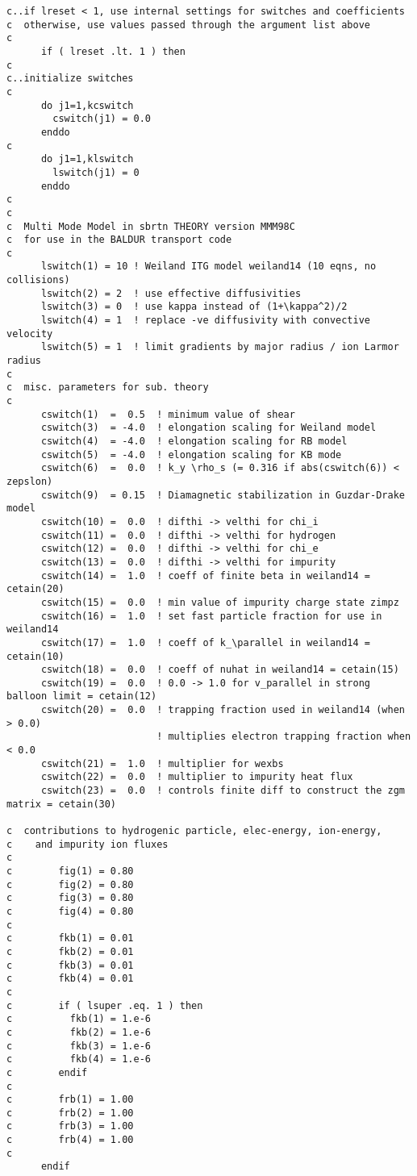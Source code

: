 \begin{verbatim}
c..if lreset < 1, use internal settings for switches and coefficients
c  otherwise, use values passed through the argument list above
c
      if ( lreset .lt. 1 ) then
c
c..initialize switches
c
      do j1=1,kcswitch
        cswitch(j1) = 0.0
      enddo
c
      do j1=1,klswitch
        lswitch(j1) = 0
      enddo
c
c
c  Multi Mode Model in sbrtn THEORY version MMM98C
c  for use in the BALDUR transport code
c
      lswitch(1) = 10 ! Weiland ITG model weiland14 (10 eqns, no collisions)
      lswitch(2) = 2  ! use effective diffusivities
      lswitch(3) = 0  ! use kappa instead of (1+\kappa^2)/2
      lswitch(4) = 1  ! replace -ve diffusivity with convective velocity
      lswitch(5) = 1  ! limit gradients by major radius / ion Larmor radius
c
c  misc. parameters for sub. theory
c
      cswitch(1)  =  0.5  ! minimum value of shear
      cswitch(3)  = -4.0  ! elongation scaling for Weiland model
      cswitch(4)  = -4.0  ! elongation scaling for RB model
      cswitch(5)  = -4.0  ! elongation scaling for KB mode
      cswitch(6)  =  0.0  ! k_y \rho_s (= 0.316 if abs(cswitch(6)) < zepslon)
      cswitch(9)  = 0.15  ! Diamagnetic stabilization in Guzdar-Drake model
      cswitch(10) =  0.0  ! difthi -> velthi for chi_i
      cswitch(11) =  0.0  ! difthi -> velthi for hydrogen
      cswitch(12) =  0.0  ! difthi -> velthi for chi_e
      cswitch(13) =  0.0  ! difthi -> velthi for impurity
      cswitch(14) =  1.0  ! coeff of finite beta in weiland14 = cetain(20)
      cswitch(15) =  0.0  ! min value of impurity charge state zimpz
      cswitch(16) =  1.0  ! set fast particle fraction for use in weiland14
      cswitch(17) =  1.0  ! coeff of k_\parallel in weiland14 = cetain(10)
      cswitch(18) =  0.0  ! coeff of nuhat in weiland14 = cetain(15)
      cswitch(19) =  0.0  ! 0.0 -> 1.0 for v_parallel in strong balloon limit = cetain(12)
      cswitch(20) =  0.0  ! trapping fraction used in weiland14 (when > 0.0)
                          ! multiplies electron trapping fraction when < 0.0
      cswitch(21) =  1.0  ! multiplier for wexbs 
      cswitch(22) =  0.0  ! multiplier to impurity heat flux
      cswitch(23) =  0.0  ! controls finite diff to construct the zgm matrix = cetain(30)

c  contributions to hydrogenic particle, elec-energy, ion-energy,
c    and impurity ion fluxes
c
c        fig(1) = 0.80
c        fig(2) = 0.80
c        fig(3) = 0.80
c        fig(4) = 0.80
c
c        fkb(1) = 0.01
c        fkb(2) = 0.01
c        fkb(3) = 0.01
c        fkb(4) = 0.01
c
c        if ( lsuper .eq. 1 ) then
c          fkb(1) = 1.e-6
c          fkb(2) = 1.e-6
c          fkb(3) = 1.e-6
c          fkb(4) = 1.e-6
c        endif
c
c        frb(1) = 1.00
c        frb(2) = 1.00
c        frb(3) = 1.00
c        frb(4) = 1.00
c
      endif

\end{verbatim}


